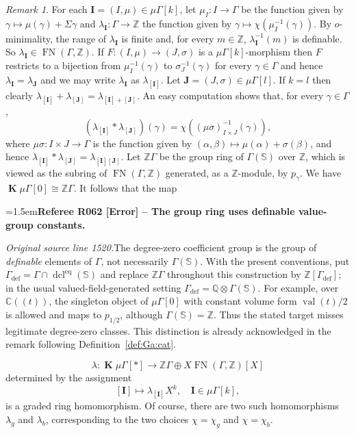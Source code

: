 \documentclass[12pt]{amsart}
\newcommand{\RefereeRemark}[4]{%
  \par\medskip\begingroup\normalfont\small\color{RefereePurple}%
  \emergencystretch=1.5em\noindent\textbf{Referee R#1 [#2] -- #3.}\par\nobreak\noindent #4\par
  \endgroup\medskip
}
\theoremstyle{plain}
\theoremstyle{definition}
\theoremstyle{remark}
\newtheorem{rem}[thm]{Remark}
\numberwithin{equation}{section}
\theoremstyle{plain}
\DeclareMathOperator{\dcl}{dcl}
\newcommand{\Z}{\mathds{Z}}
\newcommand{\omin}{$o$\nobreakdash}
\newcommand{\0}{\emptyset}
\newcommand{\fun}{\longrightarrow}
\newcommand{\efun}{\longmapsto}
\newcommand{\mG}{{\mu}{\Gamma}}
\DeclareMathOperator{\ggk}{\mathbf{K}}
\DeclareMathOperator{\fn}{FN}
\begin{document}
\begin{rem}\label{int:Gam}
For each $\bm I = (I, \mu) \in \mG[k]$, let $\mu_I : I \fun \Gamma$ be the function given by $\gamma \efun \mu(\gamma) + \Sigma\gamma$ and $\lambda_{\bm I} : \Gamma \fun \Z$  the function given by $\gamma \efun \chi(\mu^{-1}_I(\gamma))$. By \omin-minimality, the range of $\lambda_{\bm I}$ is finite and, for every $m \in \Z$, $\lambda_{\bm I}^{-1}(m)$ is definable. So $\lambda_{\bm I} \in \fn(\Gamma, \Z)$. If $F :(I, \mu) \fun (J, \sigma)$ is a $\mG[k]$-morphism then $F$ restricts to a bijection from $\mu^{-1}_I(\gamma)$ to $\sigma_J^{-1}(\gamma)$ for every $\gamma \in \Gamma$ and hence $\lambda_{\bm I} = \lambda_{\bm J}$ and we may write $\lambda_{\bm I}$ as $\lambda_{[\bm I]}$. Let $\bm J = (J, \sigma) \in \mG[l]$. If $k=l$ then clearly $\lambda_{[\bm I]} + \lambda_{[\bm J]} = \lambda_{[\bm I]+[\bm J]}$. An easy computation shows that, for every $\gamma \in \Gamma$,
\[
(\lambda_{[\bm I]} * \lambda_{[\bm J]})(\gamma) = \chi( (\mu \sigma)^{-1}_{I \times J}(\gamma)),
\]
where $\mu \sigma : I \times J \fun \Gamma$ is the function given by $(\alpha, \beta) \efun \mu(\alpha) + \sigma(\beta)$, and hence $\lambda_{[\bm I]} * \lambda_{[\bm J]} = \lambda_{[\bm I][\bm J]}$. Let $\Z\Gamma$ be the group ring of $\Gamma(\mathbb{S})$ over $\Z$, which is viewed as the subring of $\fn(\Gamma, \Z)$ generated, as a $\Z$-module, by $p_{\gamma}$. We have $\ggk \mG[0] \cong \Z\Gamma$. It follows that the map

\RefereeRemark{062}{Error}{The group ring uses definable value-group constants}{%
\textit{Original source line 1520.}\quad The degree-zero coefficient group is the group of \emph{definable} elements of $\Gamma$, not necessarily $\Gamma(\mathbb S)$. With the present conventions, put $\Gamma_{\mathrm{def}}=\Gamma\cap\dcl^{\mathrm{eq}}(\mathbb S)$ and replace $\mathbb Z\Gamma$ throughout this construction by $\mathbb Z[\Gamma_{\mathrm{def}}]$; in the usual valued-field-generated setting $\Gamma_{\mathrm{def}}=\mathbb Q\otimes\Gamma(\mathbb S)$. For example, over $\mathbb C((t))$, the singleton object of $\mu\Gamma[0]$ with constant volume form $\operatorname{val}(t)/2$ is allowed and maps to $p_{1/2}$, although $\Gamma(\mathbb S)=\mathbb Z$. Thus the stated target misses legitimate degree-zero classes. This distinction is already acknowledged in the remark following Definition~\ref{def:Ga:cat}.
}
\[
\lambda : \ggk \mG[*] \fun \Z\Gamma \oplus X \fn(\Gamma, \Z)[X]
\]
determined by the assignment
\[
[\bm I] \efun \lambda_{[\bm I]}X^k, \quad \bm I \in \mG[k],
\]
is a graded ring homomorphism. Of course, there are two such homomorphisms $\lambda_g$ and $\lambda_b$, corresponding to the two choices $\chi = \chi_{g}$ and $\chi = \chi_{b}$.
\end{rem}
\end{document}
